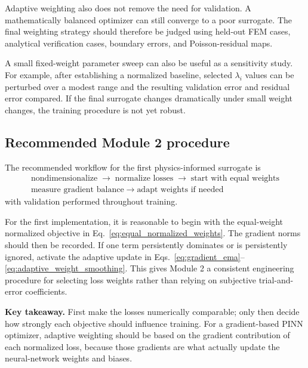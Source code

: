 \documentclass[11pt]{article}
\begin{document}
Adaptive weighting also does not remove the need for validation. A mathematically balanced optimizer can still converge to a poor surrogate. The final weighting strategy should therefore be judged using held-out FEM cases, analytical verification cases, boundary errors, and Poisson-residual maps.

A small fixed-weight parameter sweep can also be useful as a sensitivity study. For example, after establishing a normalized baseline, selected $\lambda_i$ values can be perturbed over a modest range and the resulting validation error and residual error compared. If the final surrogate changes dramatically under small weight changes, the training procedure is not yet robust.

\subsection{Recommended Module 2 procedure}

The recommended workflow for the first physics-informed surrogate is
\begin{equation}
\boxed{\begin{gathered}
\text{nondimensionalize}\;\longrightarrow\;\text{normalize losses}
\;\longrightarrow\;\text{start with equal weights}\\
\text{measure gradient balance}\;\longrightarrow\;\text{adapt weights if needed}
\end{gathered}}
\end{equation}
with validation performed throughout training.

For the first implementation, it is reasonable to begin with the equal-weight normalized objective in Eq.~\eqref{eq:equal_normalized_weights}. The gradient norms should then be recorded. If one term persistently dominates or is persistently ignored, activate the adaptive update in Eqs.~\eqref{eq:gradient_ema}--\eqref{eq:adaptive_weight_smoothing}. This gives Module 2 a consistent engineering procedure for selecting loss weights rather than relying on subjective trial-and-error coefficients.

\begin{physicsbox}
\textbf{Key takeaway.} First make the losses numerically comparable; only then decide how strongly each objective should influence training. For a gradient-based PINN optimizer, adaptive weighting should be based on the gradient contribution of each normalized loss, because those gradients are what actually update the neural-network weights and biases.
\end{physicsbox}
\end{document}
